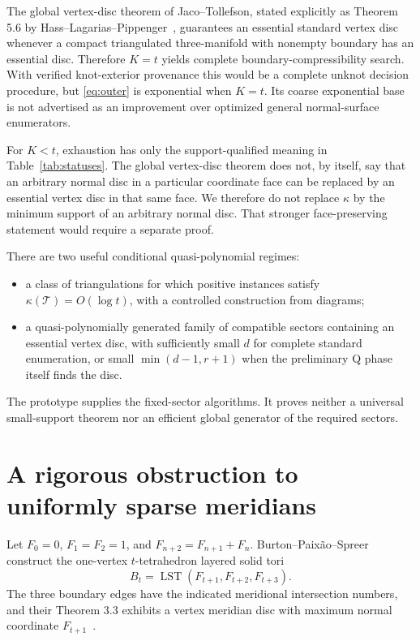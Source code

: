\documentclass[11pt]{article}
\theoremstyle{definition}
\theoremstyle{remark}
\begin{document}
The global vertex-disc theorem of Jaco--Tollefson, stated explicitly as
Theorem 5.6 by Hass--Lagarias--Pippenger~\cite{hlp,jacotollefson}, guarantees
an essential standard vertex disc whenever a compact triangulated
three-manifold with nonempty boundary has an essential disc. Therefore
$K=t$ yields complete boundary-compressibility search. With verified
knot-exterior provenance this would be a complete unknot decision procedure,
but \eqref{eq:outer} is exponential when $K=t$. Its coarse exponential base
is not advertised as an improvement over optimized general normal-surface
enumerators.

For $K<t$, exhaustion has only the support-qualified meaning in
Table~\ref{tab:statuses}. The global vertex-disc theorem does not, by itself,
say that an arbitrary normal disc in a particular coordinate face can be
replaced by an essential vertex disc in that same face. We therefore do not
replace $\kappa$ by the minimum support of an arbitrary normal disc. That
stronger face-preserving statement would require a separate proof.

There are two useful conditional quasi-polynomial regimes:
\begin{itemize}
\item a class of triangulations for which positive instances satisfy
$\kappa(\mathcal T)=O(\log t)$, with a controlled construction from diagrams;
\item a quasi-polynomially generated family of compatible sectors containing
an essential vertex disc, with sufficiently small $d$ for complete standard
enumeration, or small $\min(d-1,r+1)$ when the preliminary Q phase itself
finds the disc.
\end{itemize}
The prototype supplies the fixed-sector algorithms. It proves neither a
universal small-support theorem nor an efficient global generator of the
required sectors.

\section{A rigorous obstruction to uniformly sparse meridians}
\label{sec:barrier}

Let $F_0=0$, $F_1=F_2=1$, and $F_{n+2}=F_{n+1}+F_n$.
Burton--Paix\~ao--Spreer construct the one-vertex $t$-tetrahedron layered
solid tori
\begin{equation}
 B_t=\operatorname{LST}(F_{t+1},F_{t+2},F_{t+3}).
 \label{eq:lst}
\end{equation}
The three boundary edges have the indicated meridional intersection numbers,
and their Theorem 3.3 exhibits a vertex meridian disc with maximum normal
coordinate $F_{t+1}$~\cite{burtonbounds}.
\end{document}
